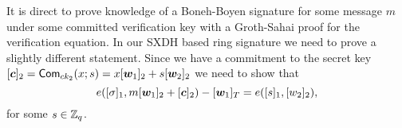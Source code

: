 It is direct to prove knowledge of a Boneh-Boyen signature for some message $m$ under some committed verification key with a Groth-Sahai proof for the verification equation. In our SXDH based ring signature we need to prove a slightly different statement. Since we have a commitment to the secret key $[{\boldsymbol{c}}]_{2} = \mathsf{Com}_{ck_2}(x;s) = x[{\boldsymbol{w}}_1]_2+s[{\boldsymbol{w}}_2]_2$ we need to show that
\begin{equation}
e([{\sigma}]_1, m[{\boldsymbol{w}}_1]_2 + [{\boldsymbol{c}}]_2) - [{\boldsymbol{w}}_1]_T= e([s]_1,[w_2]_2),
\label{eq:bbs-verification}
\end{equation}
for some $s\in\mathbb{Z}_q$.
